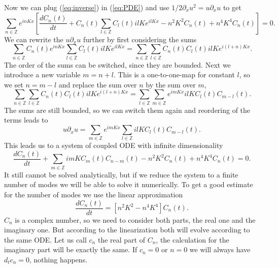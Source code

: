 Now we can plug (\ref{eq:inverse}) in (\ref{eq:PDE}) and use $1/2 \partial_x u^2 = u \partial_x u$ to get
\begin{equation}
  \sum_{n \in \mathbb{Z}} e^{in K x} \left[ \frac{d C_n(t)}{dt} + C_n(t) \sum_{l \in \mathbb{Z}} C_l(t) i l K e^{il K x} - n^2 K^2 C_n(t) + n^4 K^4 C_n(t) \right] = 0.
\end{equation}
We can rewrite the $u \partial_x u$ further by first considering the sums
\begin{equation}
  \sum_{n \in \mathbb{Z}} C_n(t)  e^{in K x} \sum_{l \in \mathbb{Z}} C_l(t) i l K e^{il K x} = \sum_{n \in \mathbb{Z}} \sum_{l \in \mathbb{Z}} C_n(t) C_l(t) i l K e^{i (l+n) K x}.
\end{equation}
The order of the sums can be switched, since they are bounded. Next we introduce a new variable $m = n + l$. This is a one-to-one-map for constant $l$, so we set $n = m - l$ and replace the sum over $n$ by the sum over $m$,
\begin{equation}
  \sum_{n \in \mathbb{Z}} \sum_{l \in \mathbb{Z}} C_n(t) C_l(t) i l K e^{i (l+n) K x} = \sum_{l \in \mathbb{Z}} \sum_{m \in \mathbb{Z}} e^{i m K x} i l K C_l(t) C_{m - l}(t).
\end{equation}
The sums are still bounded, so we can switch them again and reordering of the terms leads to
\begin{equation}
  u \partial_x u =  \sum_{m \in \mathbb{Z}} e^{i m K x} \sum_{l \in \mathbb{Z}} i l K C_l(t) C_{m - l}(t).
\end{equation}
This leads us to a system of coupled ODE with infinite dimensionality
\begin{equation}
  \frac{d C_n(t)}{dt} + \sum_{m \in \mathbb{Z}} i m K C_m(t) C_{n - m}(t) -
  n^2 K^2 C_n(t) + n^4 K^4 C_n(t) = 0. \label{eq:ODE}
\end{equation}
It still cannot be solved analytically, but if we reduce the system to a finite number of modes we will be able to solve it numerically. To get a good estimate for the number of modes we use the linear approximation
\begin{equation}
  \frac{d C_n(t)}{dt} = \left[ n^2 K^2 - n^4 K^4 \right] C_n(t).
\end{equation}
$C_n$ is a complex number, so we need to consider both parts, the real one and the imaginary one. But according to the linearization both will evolve according to the same ODE. Let us call $c_n$ the real part of $C_n$, the calculation for the imaginary part will be exactly the same. If $c_n = 0$ or $n = 0$ we will always have $d_t c_n = 0$, nothing happens.

